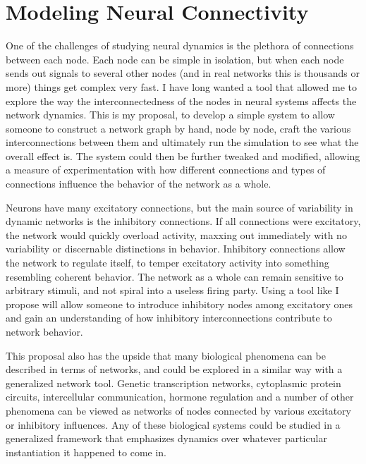 \documentclass[12pt]{article}
\begin{document}
\maketitle

\section{Modeling Neural Connectivity}

One of the challenges of studying neural dynamics is the plethora of connections between each node.  Each node can be simple in isolation, but when each node sends out signals to several other nodes (and in real networks this is thousands or more) things get complex very fast.  I have long wanted a tool that allowed me to explore the way the interconnectedness of the nodes in neural systems affects the network dynamics.  This is my proposal, to develop a simple system to allow someone to construct a network graph by hand, node by node, craft the various interconnections between them and ultimately run the simulation to see what the overall effect is.  The system could then be further tweaked and modified, allowing a measure of experimentation with how different connections and types of connections influence the behavior of the network as a whole.

Neurons have many excitatory connections, but the main source of variability in dynamic networks is the inhibitory connections.  If all connections were excitatory, the network would quickly overload activity, maxxing out immediately with no variability or discernable distinctions in behavior.  Inhibitory connections allow the network to regulate itself, to temper excitatory activity into something resembling coherent behavior.  The network as a whole can remain sensitive to arbitrary stimuli, and not spiral into a useless firing party.  Using a tool like I propose will allow someone to introduce inhibitory nodes among excitatory ones and gain an understanding of how inhibitory interconnections contribute to network behavior.

This proposal also has the upside that many biological phenomena can be described in terms of networks, and could be explored in a similar way with a generalized network tool.  Genetic transcription networks, cytoplasmic protein circuits, intercellular communication, hormone regulation and a number of other phenomena can be viewed as networks of nodes connected by various excitatory or inhibitory influences.  Any of these biological systems could be studied in a generalized framework that emphasizes dynamics over whatever particular instantiation it happened to come in.
\end{document}
